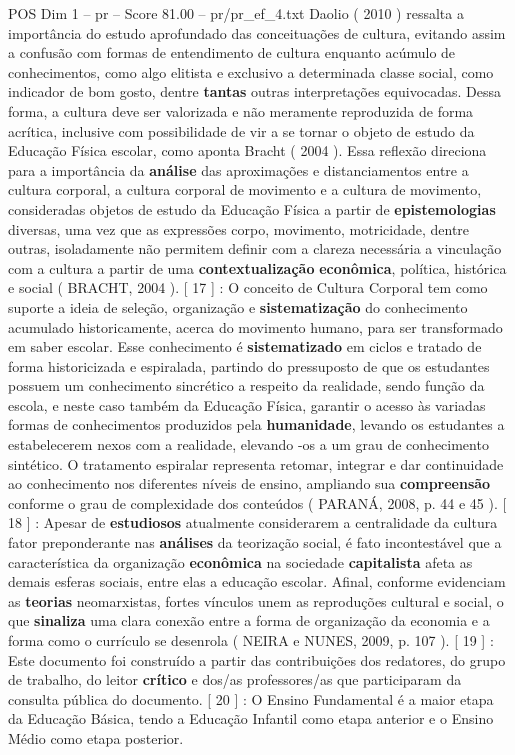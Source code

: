 \begin{textsample}{POS Dim 1 – pr – Score 81.00 – pr/pr\_ef\_4.txt}
Daolio ( 2010 ) ressalta a importância do estudo aprofundado das conceituações de cultura, evitando assim a confusão com formas de entendimento de cultura enquanto acúmulo de conhecimentos, como algo elitista e exclusivo a determinada classe social, como indicador de bom gosto, dentre \textbf{tantas} outras interpretações equivocadas.
Dessa forma, a cultura deve ser valorizada e não meramente reproduzida de forma acrítica, inclusive com possibilidade de vir a se tornar o objeto de estudo da Educação Física escolar, como aponta Bracht ( 2004 ).
Essa reflexão direciona para a importância da \textbf{análise} das aproximações e distanciamentos entre a cultura corporal, a cultura corporal de movimento e a cultura de movimento, consideradas objetos de estudo da Educação Física a partir de \textbf{epistemologias} diversas, uma vez que as expressões corpo, movimento, motricidade, dentre outras, isoladamente não permitem definir com a clareza necessária a vinculação com a cultura a partir de uma \textbf{contextualização} \textbf{econômica}, política, histórica e social ( BRACHT, 2004 ). [ 17 ] : O conceito de Cultura Corporal tem como suporte a ideia de seleção, organização e \textbf{sistematização} do conhecimento acumulado historicamente, acerca do movimento humano, para ser transformado em saber escolar.
Esse conhecimento é \textbf{sistematizado} em ciclos e tratado de forma historicizada e espiralada, partindo do pressuposto de que os estudantes possuem um conhecimento sincrético a respeito da realidade, sendo função da escola, e neste caso também da Educação Física, garantir o acesso às variadas formas de conhecimentos produzidos pela \textbf{humanidade}, levando os estudantes a estabelecerem nexos com a realidade, elevando -os a um grau de conhecimento sintético.
O tratamento espiralar representa retomar, integrar e dar continuidade ao conhecimento nos diferentes níveis de ensino, ampliando sua \textbf{compreensão} conforme o grau de complexidade dos conteúdos ( PARANÁ, 2008, p. 44 e 45 ). [ 18 ] : Apesar de \textbf{estudiosos} atualmente considerarem a centralidade da cultura fator preponderante nas \textbf{análises} da teorização social, é fato incontestável que a característica da organização \textbf{econômica} na sociedade \textbf{capitalista} afeta as demais esferas sociais, entre elas a educação escolar.
Afinal, conforme evidenciam as \textbf{teorias} neomarxistas, fortes vínculos unem as reproduções cultural e social, o que \textbf{sinaliza} uma clara conexão entre a forma de organização da economia e a forma como o currículo se desenrola ( NEIRA e NUNES, 2009, p. 107 ). [ 19 ] : Este documento foi construído a partir das contribuições dos redatores, do grupo de trabalho, do leitor \textbf{crítico} e dos/as professores/as que participaram da consulta pública do documento. [ 20 ] : O Ensino Fundamental é a maior etapa da Educação Básica, tendo a Educação Infantil como etapa anterior e o Ensino Médio como etapa posterior.

\end{textsample}

